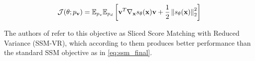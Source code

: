 \begin{equation}
    \label{eq:ssm_vr}
    \mathcal{J}(\theta; p_{\textbf{v}}) = \mathbb{E}_{p_v} \mathbb{E}_{p_d} \left[ \textbf{v}^T \nabla_{\textbf{x}} s_\theta(\textbf{x}) \textbf{v} + \frac{1}{2} \left\lVert s_\theta(\textbf{x}) \right\rVert^2_2 \right]
\end{equation}

The authors of \cite{ssm} refer to this objective as 
Sliced Score Matching with Reduced Variance (SSM-VR), which according to them produces better performance than the standard SSM objective as 
in \ref{eq:ssm_final}.





